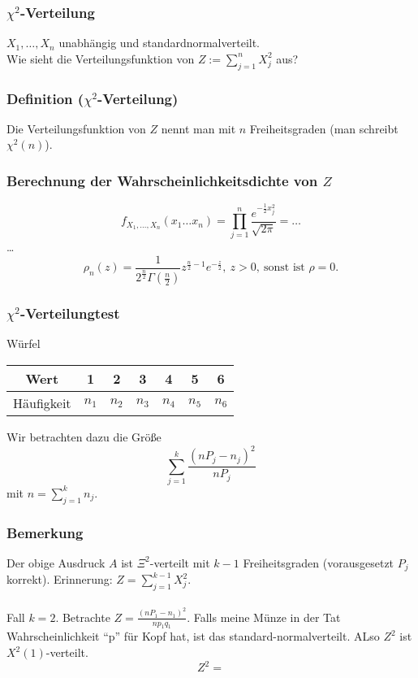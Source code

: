 \subsubsection{$\chi^2$-Verteilung}
 $X_1,\ldots,X_n$ unabh\"angig und standardnormalverteilt.\\
 Wie sieht die Verteilungsfunktion von $Z:=\sum_{j=1}^nX_j^2$ aus?
\subsubsection{Definition ($\chi^2$-Verteilung)}
Die Verteilungsfunktion von $Z$ nennt man  mit $n$ Freiheitsgraden (man schreibt $\chi^2(n)$).
\subsubsection{Berechnung der Wahrscheinlichkeitsdichte von $Z$}
\[
f_{X_1,\ldots,X_n}(x_1\ldots x_n)=\prod_{j=1}^n\frac{e^{-\frac{1}{2}x_j^2}}{\sqrt{2\pi}}=\ldots
\]
\ldots
\[
\rho_n(z)=\frac{1}{2^{\frac{n}{2}}\Gamma(\frac{n}{2})}z^{\frac{n}{2}-1}e^{-\frac{z}{2}},\ z>0,\ \text{sonst ist }\rho=0.
\]
\subsubsection{$\chi^2$-Verteilungtest}
 W\"urfel
\begin{center}
\begin{tabular}{c|c|c|c|c|c|c}
Wert&1&2&3&4&5&6\\
\hline
H\"aufigkeit&$n_1$&$n_2$&$n_3$&$n_4$&$n_5$&$n_6$
\end{tabular}
\end{center}
Wir betrachten dazu die Gr\"o\ss{}e
\[
\sum_{j=1}^k\frac{(nP_j-n_j)^2}{nP_j}
\]
mit $n=\sum_{j=1}^kn_j$.
\subsubsection{Bemerkung}
Der obige Ausdruck $A$ ist $\Xi^2$-verteilt mit $k-1$ Freiheitsgraden (vorausgesetzt $P_j$ korrekt). Erinnerung: $Z=\sum_{j=1}^{k-1}X_j^2$.
\\~\\
Fall $k=2$. Betrachte $Z=\frac{(nP_1-n_1)^2}{np_1q_1}$. Falls meine M\"unze in der Tat Wahrscheinlichkeit ``p'' f\"ur Kopf hat, ist das standard-normalverteilt. ALso $Z^2$ ist $X^2(1)$-verteilt.
\[
Z^2=
\]
